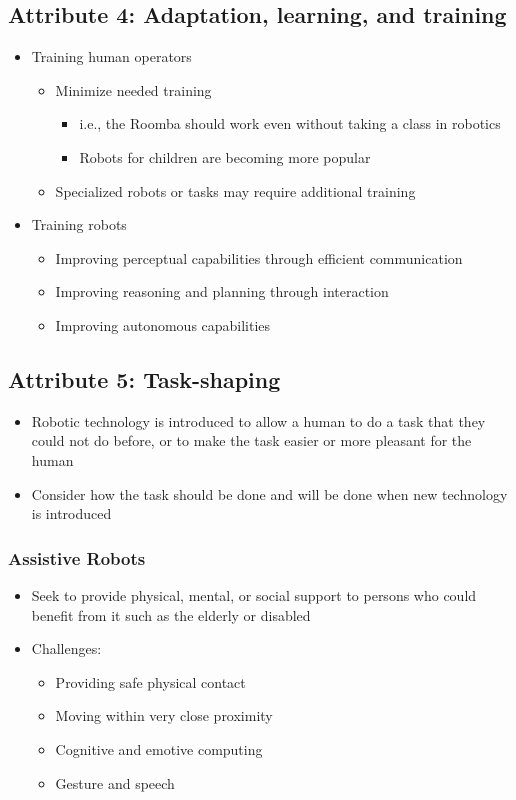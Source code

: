 \documentclass[10pt]{article}
\begin{document}
\subsection*{Attribute 4: Adaptation, learning, and training}
\begin{itemize}
	\item Training human operators
	\begin{itemize}
        \item Minimize needed training
        \begin{itemize}
            \item i.e., the Roomba should work even without taking a class in robotics
            \item Robots for children are becoming more popular
        \end{itemize}
        \item Specialized robots or tasks may require additional training
    \end{itemize}
	\item Training robots
	\begin{itemize}
        \item Improving perceptual capabilities through efficient communication
        \item Improving reasoning and planning through interaction
        \item Improving autonomous capabilities
    \end{itemize}
\end{itemize}

\subsection*{Attribute 5: Task-shaping}
\begin{itemize}
	\item Robotic technology is introduced to allow a human to do a task that they could not do before, or to make the task easier or more pleasant for the human
    \item Consider how the task should be done and will be done when new technology is introduced
\end{itemize}

\subsubsection*{Assistive Robots}
\begin{itemize}
	\item Seek to provide physical, mental, or social support to persons who could benefit from it such as the elderly or disabled
	\item Challenges:
	\begin{itemize}
        \item Providing safe physical contact
        \item Moving within very close proximity
        \item Cognitive and emotive computing
        \item Gesture and speech
    \end{itemize}
\end{itemize}
\end{document}
